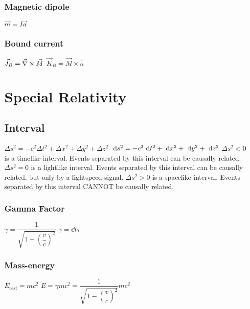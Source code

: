 \subsubsection{Magnetic dipole}
\begin{itemize}
\itemt \( \vec{m} = I\vec{a} \)
\end{itemize}

\subsubsection{Bound current}
\begin{itemize}
\itemt \( \vec{J}_B = \vec{\nabla}\times \vec{M} \)
\itemt \( \vec{K}_B = \vec{M}\times\hat{n} \)
\end{itemize}


	\section{Special Relativity}

\subsection{Interval}
\begin{itemize}
\itemt \( \Delta s^2 = -c^2\Delta t^2 + \Delta x^2 +\Delta y^2 +\Delta z^2 \)
\itemt \( \ \mathrm{d}s^2 = -c^2\ \mathrm{d}t^2 + \ \mathrm{d}x^2 + \ \mathrm{d}y^2 + \ \mathrm{d}z^2 \)
\itemt \( \Delta s^2 < 0 \) is a timelike interval. Events separated by this interval can be causally related.
\itemt \( \Delta s^2 = 0 \) is a lightlike interval. Events separated by this interval can be causally related, but only by a lightspeed signal.
\itemt \( \Delta s^2 > 0 \) is a spacelike interval. Events separated  by this interval CANNOT be causally related.
\end{itemize}

\subsubsection{Gamma Factor}		
\begin{itemize}
\itemt \( \gamma = \dfrac{1}{\sqrt{1-\left(\dfrac{v}{c}\right)^2}} \)
\itemt \( \gamma = \dd{t}{\tau}\) 
\end{itemize}		

\subsubsection{Mass-energy}
\begin{itemize}
\itemt \( E_\mathrm{rest} = mc^2\)
\itemt \( E = \gamma mc^2 = \dfrac{1}{\sqrt{1-\left(\dfrac{v}{c}\right)^2}}mc^2 \)
\end{itemize}


